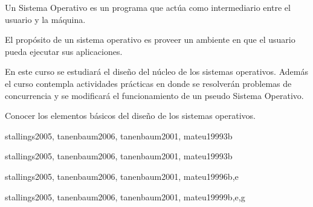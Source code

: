 \begin{syllabus}


\begin{justification}
Un Sistema Operativo es un programa que actúa como intermediario entre el usuario y la máquina.

El propósito de un sistema operativo es proveer un ambiente en que el usuario pueda ejecutar sus aplicaciones.

En este curso se estudiará el diseño del núcleo de los sistemas operativos.
Además el curso contempla actividades prácticas en donde se resolverán problemas de 
concurrencia y se modificará el funcionamiento de un pseudo Sistema Operativo.
\end{justification}

\begin{goals}
\item Conocer los elementos básicos del diseño de los sistemas operativos.
\end{goals}

\begin{outcomes}
\end{outcomes}

\begin{unit}{\ALAlgorithmicStrategies}{}{stallings2005, tanenbaum2006, tanenbaum2001, mateu1999}{3}{b}
    \ALAlgorithmicStrategiesAllTopics
    \ALAlgorithmicStrategiesAllLearningOutcomes
\end{unit}

\begin{unit}{\OSOverviewofOperatingSystems}{}{stallings2005, tanenbaum2006, tanenbaum2001, mateu1999}{3}{b}
    \OSOverviewofOperatingSystemsAllTopics
    \OSOverviewofOperatingSystemsAllLearningOutcomes
\end{unit}

\begin{unit}{\OSOperatingSystemPrinciples}{}{stallings2005, tanenbaum2006, tanenbaum2001, mateu1999}{6}{b,e}
    \OSOperatingSystemPrinciplesAllTopics
    \OSOperatingSystemPrinciplesAllLearningOutcomes
\end{unit}

\begin{unit}{\OSConcurrency}{}{stallings2005, tanenbaum2006, tanenbaum2001, mateu1999}{9}{b,e,g}
    \OSConcurrencyAllTopics
    \OSConcurrencyAllLearningOutcomes
\end{unit}


\end{syllabus}
